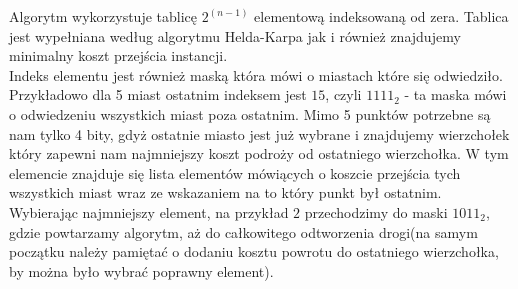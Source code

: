 \documentclass{article}
\begin{document}
Algorytm wykorzystuje tablicę $2^{(n-1)}$ elementową indeksowaną od zera. Tablica jest wypełniana według algorytmu Helda-Karpa jak i również znajdujemy minimalny koszt przejścia instancji.\\ Indeks elementu jest również maską która mówi o miastach które się odwiedziło. Przykładowo dla 5 miast ostatnim indeksem jest $15$, czyli $1111_{2}$ - ta maska mówi o odwiedzeniu wszystkich miast poza ostatnim. Mimo 5 punktów potrzebne są nam tylko 4 bity, gdyż ostatnie miasto jest już wybrane i znajdujemy wierzchołek który zapewni nam najmniejszy koszt podroży od ostatniego wierzchołka. W tym elemencie znajduje się lista elementów mówiących o koszcie przejścia tych wszystkich miast wraz ze wskazaniem na to który punkt był ostatnim. Wybierając najmniejszy element, na przykład $2$ przechodzimy do maski $1011_{2}$, gdzie powtarzamy algorytm, aż do całkowitego odtworzenia drogi(na samym początku należy pamiętać o dodaniu kosztu powrotu do ostatniego wierzchołka, by można było wybrać poprawny element). 
\end{document}
